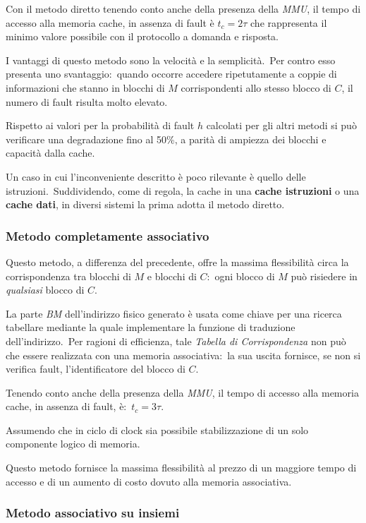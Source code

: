 Con il metodo diretto tenendo conto anche della presenza della \textit{MMU}, il tempo di accesso alla memoria cache, in assenza di fault è $t_c = 2\tau$ che rappresenta il minimo valore possibile con il protocollo a domanda e risposta.

I vantaggi di questo metodo sono la velocità e la semplicità.\
Per contro esso presenta uno svantaggio:\ quando occorre accedere ripetutamente a coppie di informazioni che stanno in blocchi di $M$ corrispondenti allo stesso blocco di $C$, il numero di fault risulta molto elevato.

Rispetto ai valori per la probabilità di fault $h$ calcolati per gli altri metodi si può verificare una degradazione fino al 50\%, a parità di ampiezza dei blocchi e capacità dalla cache.

Un caso in cui l'inconveniente descritto è poco rilevante è quello delle istruzioni.\
Suddividendo, come di regola, la cache in una \textbf{cache istruzioni} o una \textbf{cache dati}, in diversi sistemi la prima adotta il metodo diretto.

\subsubsection{Metodo completamente associativo}

Questo metodo, a differenza del precedente, offre la massima flessibilità circa la corrispondenza tra blocchi di $M$ e blocchi di $C$:\ ogni blocco di $M$ può risiedere in \textit{qualsiasi} blocco di $C$.

La parte \textit{BM} dell'indirizzo fisico generato è usata come chiave per una ricerca tabellare mediante la quale implementare la funzione di traduzione dell'indirizzo.\
Per ragioni di efficienza, tale \textit{Tabella di Corrispondenza} non può che essere realizzata con una memoria associativa:\ la sua uscita fornisce, se non si verifica fault, l'identificatore del blocco di $C$.

Tenendo conto anche della presenza della \textit{MMU}, il tempo di accesso alla memoria cache, in assenza di fault, è:\ $t_c = 3\tau$.

Assumendo che in ciclo di clock sia possibile stabilizzazione di un solo componente logico di memoria.

Questo metodo fornisce la massima flessibilità al prezzo di un maggiore tempo di accesso e di un aumento di costo dovuto alla memoria associativa.

\subsubsection{Metodo associativo su insiemi}

